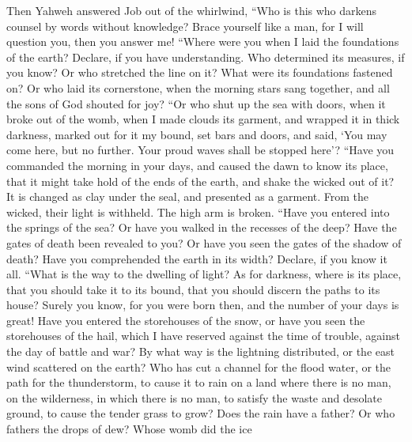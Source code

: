  Then Yahweh answered Job out of the whirlwind,
 ``Who is this who darkens counsel by words without
knowledge?  Brace yourself like a man, for I will question
you, then you answer me!  ``Where were you when I laid the
foundations of the earth? Declare, if you have understanding.
 Who determined its measures, if you know? Or who
stretched the line on it?  What were its foundations
fastened on? Or who laid its cornerstone,  when the
morning stars sang together, and all the sons of God shouted for joy?
 ``Or who shut up the sea with doors, when it broke out of
the womb,  when I made clouds its garment, and wrapped it
in thick darkness,  marked out for it my bound, set bars
and doors,  and said, `You may come here, but no further.
Your proud waves shall be stopped here'?  ``Have you
commanded the morning in your days, and caused the dawn to know its
place,  that it might take hold of the ends of the earth,
and shake the wicked out of it?  It is changed as clay
under the seal, and presented as a garment.  From the
wicked, their light is withheld. The high arm is broken. 
``Have you entered into the springs of the sea? Or have you walked in
the recesses of the deep?  Have the gates of death been
revealed to you? Or have you seen the gates of the shadow of death?
 Have you comprehended the earth in its width? Declare,
if you know it all.  ``What is the way to the dwelling of
light? As for darkness, where is its place,  that you
should take it to its bound, that you should discern the paths to its
house?  Surely you know, for you were born then, and the
number of your days is great!  Have you entered the
storehouses of the snow, or have you seen the storehouses of the hail,
 which I have reserved against the time of trouble,
against the day of battle and war?  By what way is the
lightning distributed, or the east wind scattered on the earth?
 Who has cut a channel for the flood water, or the path
for the thunderstorm,  to cause it to rain on a land
where there is no man, on the wilderness, in which there is no man,
 to satisfy the waste and desolate ground, to cause the
tender grass to grow?  Does the rain have a father? Or
who fathers the drops of dew?  Whose womb did the ice
